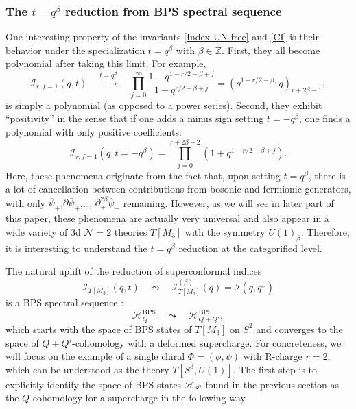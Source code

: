 \documentclass[hyper,letterpaper]{JHEP3}
\newcommand{\be}{\begin{equation}}
\newcommand{\ee}{\end{equation}}
\newcommand{\Z}{{\mathbb Z}}
\renewcommand{\bar}{\overline}
\def\CH{{\mathcal H}}
\def\CI{{\mathcal I}}
\def\CN{{\mathcal N}}
\begin{document}
\subsubsection{The $t=q^{\beta}$ reduction from BPS spectral sequence}\label{sec:Spec}

One interesting property of the invariants \eqref{Index-UN-free} and \eqref{CI} is their behavior under the specialization $t=q^{\beta}$ with $\beta\in \Z$. First, they all become polynomial after taking this limit. For example,
\be
\CI_{r,f=1} (q,t) \quad \overset{t=q^\beta}{\longrightarrow}\quad \prod_{j=0}^{\infty} \frac{1 - q^{1-r/2-\beta+j}}{1- q^{r/2+\beta+j}}=(q^{1-r/2-\beta};q)_{r+2\beta-1},
\ee
is simply a polynomial (as opposed to a power series).
Second, they exhibit ``positivity'' in the sense that if one adds a minus sign setting $t=-q^{\beta}$, one finds
a polynomial with only positive coefficients:
\be
\CI_{r,f=1}(q,t=-q^\beta)=\prod_{j=0}^{r+2\beta-2} \left(1+q^{1-r/2-\beta+j}\right).
\ee
Here, these phenomena originate from the fact that, upon setting $t=q^\beta$, there is a lot of cancellation between contributions from bosonic and fermionic generators, with only $\bar{\psi}_+$,$\partial \bar{\psi}_+$,\ldots, $\partial_+^{2\beta}\bar{\psi}_+$ remaining. However, as we will see in later part of this paper, these phenomena are actually very universal and also appear in a wide variety of 3d $\CN=2$ theories $T[M_3]$ with the symmetry $U(1)_{\beta}$. Therefore, it is interesting to understand the $t=q^\beta$ reduction at the categorified level.

The natural uplift of the reduction of superconformal indices
\be
\CI_{T[M_3]}(q,t) \quad \leadsto \quad \CI_{T[M_3]}^{(\beta)}(q)=\CI(q,q^\beta)
\ee
is a BPS spectral sequence \cite{Gukov:2015gmm}:
\be\label{BPSSpec}
\CH_{Q}^{\text{BPS}} \quad \leadsto \quad \CH_{Q+Q'}^{\text{BPS}},
\ee
which starts with the space of BPS states of $T[M_3]$ on $S^2$ and converges to the space of $Q+Q'$-cohomology with a deformed supercharge. For concreteness, we will focus on the example of a single chiral $\Phi=(\phi,\psi)$ with R-charge $r=2$, which can be understood as the theory $T[S^3, U(1)]$. The first step is to explicitly identify the space of BPS states $\CH_{S^2}$ found in the previous section as the $Q$-cohomology for a supercharge in the following way.
\end{document}
